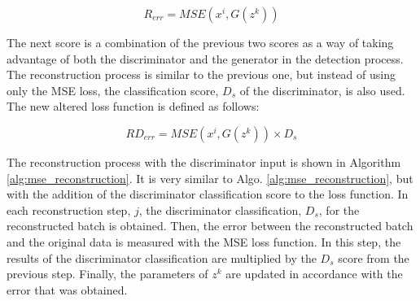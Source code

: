 \begin{equation}
    R_{err} = MSE(x^i, G(z^{k}))
\end{equation}



The next score is a combination of the previous two scores as a way of taking advantage of both the discriminator and the generator in the detection process. The reconstruction process is similar to the previous one, but instead of using only the MSE loss, the classification score, $D_{s}$ of the discriminator, is also used. The new altered loss function is defined as follows:

\begin{equation}
    RD_{err} = MSE(x^i, G(z^{k})) \times D_{s}
\end{equation}

The reconstruction process with the discriminator input is shown in Algorithm \ref{alg:mse_reconstruction}. It is very similar to Algo. \ref{alg:mse_reconstruction}, but with the addition of the discriminator classification score to the loss function. In each reconstruction step, $j$, the discriminator classification, $D_s$, for the reconstructed batch is obtained. Then, the error between the reconstructed batch and the original data is measured with the MSE loss function. In this step, the results of the discriminator classification are multiplied by the $D_s$ score from the previous step. Finally, the parameters of $z^k$ are updated in accordance with the error that was obtained.
\\

\noindent{}


